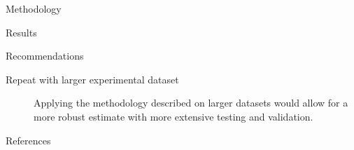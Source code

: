 \documentclass[a0paper,portrait]{baposter}
\begin{document}
\begin{poster}
\begin{posterbox}[name=method,span=2,column=1,below=intro]{Methodology}
\end{posterbox}

\begin{posterbox}[name=results,column=1,below=method,above=bottom]{Results}
  
\begin{center}
\end{center}

\end{posterbox}

\begin{posterbox}[name=recommend,column=2,below=method]{Recommendations}
  \begin{description}
    \item [Repeat with larger experimental dataset] Applying the methodology described on larger datasets would allow for a more robust estimate with more extensive testing and validation.
  \end{description}
\end{posterbox}

\begin{posterbox}[name=refs,column=2,below=recommend,above=bottom]{References}
  \renewcommand*{\bibfont}{\scriptsize}
  \printbibliography[heading=none]
\end{posterbox}

\end{poster}
\end{document}
